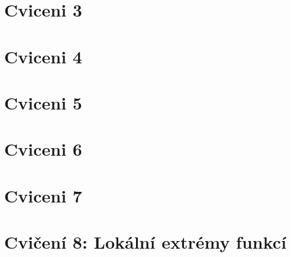 \documentclass{article}
\theoremstyle{definition}
\begin{document}
\section{Cviceni 3}

\clearpage
\newpage
\section{Cviceni 4}

\clearpage
\newpage
\section{Cviceni 5}

\clearpage
\newpage
\section{Cviceni 6}

\clearpage
\newpage
\section{Cviceni 7}

\clearpage
\newpage
\section{Cvičení 8: Lokální extrémy funkcí}
\end{document}
